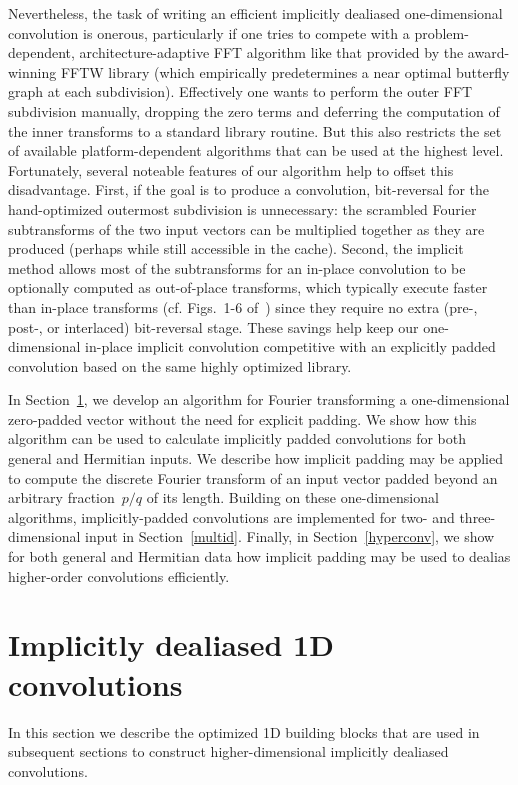 \documentclass[final]{siamltex}
\begin{document}
Nevertheless, the task of writing an efficient implicitly dealiased
one-dimensional convolution is onerous, particularly if one tries to
compete with a problem-dependent, architecture-adaptive
FFT algorithm like that provided by the award-winning FFTW \cite{Frigo05}
library (which empirically predetermines a near optimal butterfly graph
at each subdivision). Effectively one wants to perform
the outer FFT subdivision manually, dropping the zero terms and
deferring the computation of the inner transforms to a standard library
routine. But this also restricts the set of available platform-dependent
algorithms that can be used at the highest level. Fortunately, several 
noteable features of our algorithm help to offset this disadvantage. First, if
the goal is to  produce a convolution, bit-reversal for the hand-optimized
outermost subdivision is unnecessary: the scrambled Fourier subtransforms of the
two input vectors can be multiplied together as they are produced
(perhaps while still accessible in the cache). Second, the implicit
method allows most of the subtransforms for an in-place convolution to
be optionally computed as out-of-place transforms, which typically execute
faster than in-place transforms (cf. Figs.~1-6 of~\cite{Frigo05}) since they
require no extra (pre-, post-, or interlaced) bit-reversal stage.  These
savings help keep our one-dimensional in-place implicit convolution
competitive with an explicitly padded convolution based on the same highly
optimized library.

In Section~\ref{1d}, we develop an algorithm for Fourier transforming a
one-dimensional zero-padded vector without the need for explicit
padding. We show how this algorithm can be used to calculate implicitly
padded convolutions for both general and Hermitian inputs. 
We describe how implicit padding may be
applied to compute the discrete Fourier transform of an input
vector padded beyond an arbitrary fraction~$p/q$ of its length. 
Building on these one-dimensional algorithms, implicitly-padded
convolutions are implemented for two- and three-dimensional input 
in Section~\ref{multid}. Finally, in Section~\ref{hyperconv}, we
show for both general and Hermitian data how implicit padding may be used to
dealias higher-order convolutions efficiently.

\section{Implicitly dealiased 1D convolutions}\label{1d}
In this section we describe the optimized 1D building blocks
that are used in subsequent sections to construct higher-dimensional
implicitly dealiased convolutions.
\end{document}
